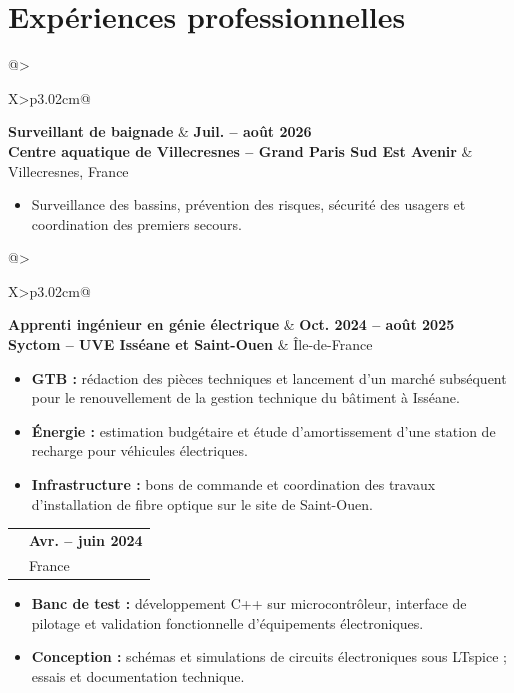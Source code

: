 \documentclass[10pt,a4paper]{article}
\makeatletter
\newcommand{\cventry}[4]{%
  \noindent\begin{tabularx}{\linewidth}{@{}>{\raggedright\arraybackslash}X>{\raggedleft\arraybackslash}p{3.02cm}@{}}
    {\color{vert}\bfseries #1} & {\bfseries\small #2} \\[-1.2pt]
    {\color{bleu}\bfseries #3} & {\small #4}
  \end{tabularx}\vspace{-4pt}\par
}
\newcommand{\itemgap}{\vspace{1.5pt}}
\makeatother
\begin{document}
\section{Expériences professionnelles}
\cventry{Surveillant de baignade}{Juil. -- août 2026}{Centre aquatique de Villecresnes -- Grand Paris Sud Est Avenir}{Villecresnes, France}
\begin{itemize}
  \item Surveillance des bassins, prévention des risques, sécurité des usagers et coordination des premiers secours.
\end{itemize}
\itemgap
\cventry{Apprenti ingénieur en génie électrique}{Oct. 2024 -- août 2025}{Syctom -- UVE Isséane et Saint-Ouen}{Île-de-France}
\begin{itemize}
  \item \textbf{GTB :} rédaction des pièces techniques et lancement d'un marché subséquent pour le renouvellement de la gestion technique du bâtiment à Isséane.
  \item \textbf{Énergie :} estimation budgétaire et étude d'amortissement d'une station de recharge pour véhicules électriques.
  \item \textbf{Infrastructure :} bons de commande et coordination des travaux d'installation de fibre optique sur le site de Saint-Ouen.
\end{itemize}
\itemgap
\cventry{Stage -- Technicien électronicien supérieur}{Avr. -- juin 2024}{Cobham Aerospace Communications}{France}
\begin{itemize}
  \item \textbf{Banc de test :} développement C++ sur microcontrôleur, interface de pilotage et validation fonctionnelle d'équipements électroniques.
  \item \textbf{Conception :} schémas et simulations de circuits électroniques sous LTspice ; essais et documentation technique.
\end{itemize}

\end{document}
